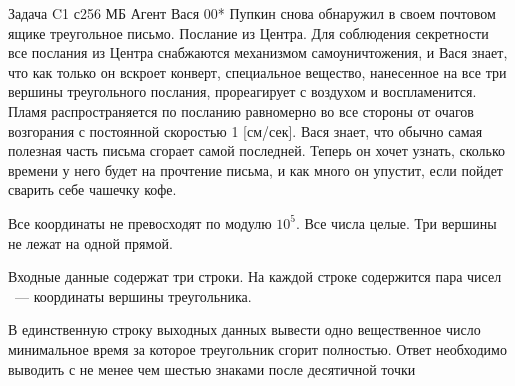 \begin{problem}{Задача C}{1 с}{256 МБ}
Агент Вася 00* Пупкин снова обнаружил в своем почтовом ящике треугольное
письмо. Послание из Центра. Для соблюдения секретности все послания из Центра
снабжаются механизмом самоуничтожения, и Вася знает, что как только он вскроет
конверт, специальное вещество, нанесенное на все три вершины треугольного послания,
прореагирует с воздухом и воспламенится.
Пламя распространяется по посланию равномерно во все стороны от очагов
возгорания с постоянной скоростью 1 [см/сек]. Вася знает, что обычно самая полезная
часть письма сгорает самой последней. Теперь он хочет узнать, сколько времени у него
будет на прочтение письма, и как много он упустит, если пойдет сварить себе чашечку
кофе.\\
\Limit

Все координаты не превосходят по модулю $10^5$.
Все числа целые.
Три вершины не лежат на одной прямой.

\InputFile
Входные данные содержат три строки. На каждой строке содержится пара чисел
~--- координаты вершины треугольника.

\OutputFile
В единственную строку выходных данных вывести одно вещественное число
минимальное время за которое треугольник сгорит полностью. Ответ необходимо
выводить с не менее чем шестью знаками после десятичной точки

\Example
\begin{example}
\end{example}
\end{problem}
